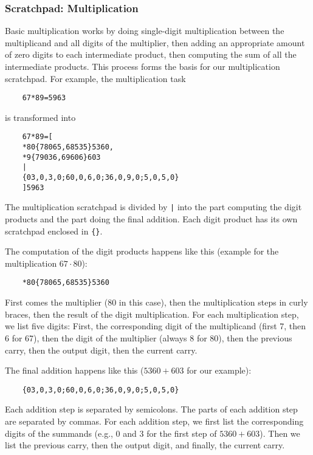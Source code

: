 \subsubsection{Scratchpad: Multiplication}
\label{mul_scratchpad}

Basic multiplication works by doing single-digit multiplication between the multiplicand and all digits of the multiplier, then adding an appropriate amount of zero digits to each intermediate product, then computing the sum of all the intermediate products. This process forms the basis for our multiplication scratchpad. For example, the multiplication task

\begin{lstlisting}
	67*89=5963
\end{lstlisting}

\noindent
is transformed into

\begin{lstlisting}
	67*89=[
	*80{78065,68535}5360,
	*9{79036,69606}603
	|
	{03,0,3,0;60,0,6,0;36,0,9,0;5,0,5,0}
	]5963
\end{lstlisting}

\noindent
The multiplication scratchpad is divided by \verb!|! into the part computing the digit products and the part doing the final addition.
Each digit product has its own scratchpad enclosed in \verb!{}!.

The computation of the digit products happens like this (example for the multiplication $67 \cdot 80$):

\begin{lstlisting}
	*80{78065,68535}5360
\end{lstlisting}

First comes the multiplier (80 in this case), then the multiplication steps in curly braces, then the result of the digit multiplication.
For each multiplication step, we list five digits: First, the corresponding digit of the multiplicand (first 7, then 6 for 67), then the digit of the multiplier (always 8 for 80), then the previous carry, then the output digit, then the current carry.

The final addition happens like this ($5360+603$ for our example):

\begin{lstlisting}
	{03,0,3,0;60,0,6,0;36,0,9,0;5,0,5,0}
\end{lstlisting}

Each addition step is separated by semicolons. The parts of each addition step are separated by commas. For each addition step, we first list the corresponding digits of the summands (e.g., 0 and 3 for the first step of $5360+603$). Then we list the previous carry, then the output digit, and finally, the current carry.

